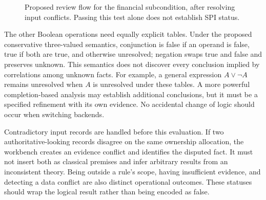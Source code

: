 
\begin{figure}[!htbp]
\centering
{}
\caption{Proposed review flow for the financial subcondition, after resolving
input conflicts. Passing this test alone does not establish SPI status.}
\label{fig:financial-flow}
\end{figure}

The other Boolean operations need equally explicit tables. Under the proposed
conservative three-valued semantics, conjunction is false if an operand is false,
true if both are true, and otherwise unresolved; negation swaps true and false
and preserves unknown. This semantics does not discover every conclusion implied
by correlations among unknown facts. For example, a general expression
$A\lor\neg A$ remains unresolved when $A$ is unresolved under these tables.
A more powerful completion-based analysis may establish additional conclusions,
but it must be a specified refinement with its own evidence. No accidental
change of logic should occur when switching backends.

Contradictory input records are handled before this evaluation. If two
authoritative-looking records disagree on the same ownership allocation, the
workbench creates an evidence conflict and identifies the disputed fact. It must
not insert both as classical premises and infer arbitrary results from an
inconsistent theory. Being outside a rule's scope, having insufficient evidence,
and detecting a data conflict are also distinct operational outcomes. These
statuses should wrap the logical result rather than being encoded as false.

